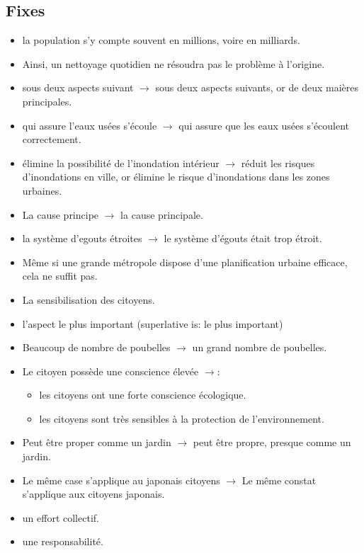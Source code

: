 \documentclass{book}
\begin{document}
        \subsection*{Fixes}
            \begin{itemize}
                \item la population s'y compte souvent en millions, voire en milliards.
                \item Ainsi, un nettoyage quotidien ne résoudra pas le problème à l'origine.
                \item sous deux aspects suivant $\to$ sous deux aspects suivants, or de deux maières principales.
                \item qui assure l'eaux usées s'écoule $\to$ qui assure que les eaux usées s'écoulent correctement.
                \item élimine la possibilité de l'inondation intérieur $\to$ réduit les risques d'inondations en ville, or élimine le risque d'inondations dans les zones urbaines.
                \item La cause principe $\to$ la cause principale.
                \item la système d'egouts étroites $\to$ le système d'égouts était trop étroit.
                \item Même si une grande métropole dispose d'une planification urbaine efficace, cela ne suffit pas.
                \item La sensibilisation des citoyens.
                \item l'aspect le plus important (superlative is: le plus important)
                \item Beaucoup de nombre de poubelles $\to$ un grand nombre de poubelles.
                \item Le citoyen possède une conscience élevée $\to$:
                \begin{itemize}
                    \item les citoyens ont une forte conscience écologique.
                    \item les citoyens sont très sensibles à la protection de l'environnement.
                \end{itemize}
                \item Peut être proper comme un jardin $\to$ peut être propre, presque comme un jardin.
                \item Le même case s'applique au japonais citoyens $\to$ Le même constat s'applique aux citoyens japonais.
                \item un effort collectif.
                \item une responsabilité.
            \end{itemize}
\end{document}
